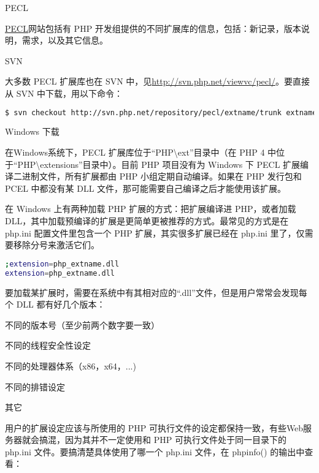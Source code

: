 \begin{compactitem}
\item PECL

\href{http://pecl.php.net/}{PECL}网站包括有 PHP 开发组提供的不同扩展库的信息，包括：新记录，版本说明，需求，以及其它信息。



\item SVN

大多数 PECL 扩展库也在 SVN 中，见\url{http://svn.php.net/viewvc/pecl/}。要直接从 SVN 中下载，用以下命令：

\begin{lstlisting}[language=bash]
$ svn checkout http://svn.php.net/repository/pecl/extname/trunk extname
\end{lstlisting}

\item Windows 下载

在Windows系统下，PECL 扩展库位于“PHP{\textbackslash}ext”目录中（在 PHP 4 中位于“PHP{\textbackslash}extensions”目录中）。目前 PHP 项目没有为 Windows 下 PECL 扩展编译二进制文件，所有扩展都由 PHP 小组定期自动编译。如果在 PHP 发行包和 PCEL 中都没有某 DLL 文件，那可能需要自己编译之后才能使用该扩展。

在 Windows 上有两种加载 PHP 扩展的方式：把扩展编译进 PHP，或者加载 DLL，其中加载预编译的扩展是更简单更被推荐的方式。最常见的方式是在 php.ini 配置文件里包含一个 PHP 扩展，其实很多扩展已经在 php.ini 里了，仅需要移除分号来激活它们。

\begin{lstlisting}[language=bash]
;extension=php_extname.dll
extension=php_extname.dll
\end{lstlisting}

要加载某扩展时，需要在系统中有其相对应的“.dll”文件，但是用户常常会发现每个 DLL 都有好几个版本：

\begin{compactitem}
\item 不同的版本号（至少前两个数字要一致）
\item 不同的线程安全性设定
\item 不同的处理器体系（x86，x64，...)
\item 不同的排错设定
\item 其它
\end{compactitem}

用户的扩展设定应该与所使用的 PHP 可执行文件的设定都保持一致，有些Web服务器就会搞混，因为其并不一定使用和 PHP 可执行文件处于同一目录下的 php.ini 文件。要搞清楚具体使用了哪一个 php.ini 文件，在 phpinfo() 的输出中查看：



\end{compactitem}
